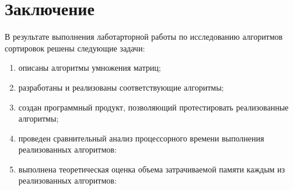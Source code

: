 \chapter*{Заключение}

В результате выполнения лаботарторной работы по исследованию алгоритмов сортировок решены следующие задачи:
\begin{enumerate}
    \item описаны алгоритмы умножения матриц;
    \item разработаны и реализованы соответствующие алгоритмы;
    \item создан программный продукт, позволяющий протестировать реализованные алгоритмы;
    \item проведен сравнительный анализ процессорного времени выполнения реализованных алгоритмов:
    \item выполнена теоретическая оценка объема затрачиваемой памяти каждым из реализованных алгоритмов: 
\end{enumerate}